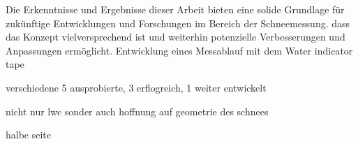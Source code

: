 Die Erkenntnisse und Ergebnisse dieser Arbeit bieten eine solide Grundlage für zukünftige Entwicklungen und Forschungen im Bereich der Schneemessung. dass das Konzept vielversprechend ist und weiterhin potenzielle Verbesserungen und Anpassungen ermöglicht.
Entwicklung eines Messablauf mit dem Water indicator tape

verschiedene 5 ausprobierte, 3 erflogreich, 1 weiter entwickelt

nicht nur lwc sonder auch hoffnung auf geometrie des schnees

halbe seite
